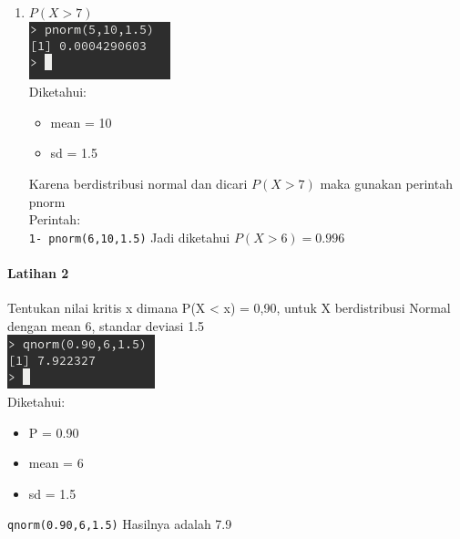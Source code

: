 \documentclass[a4paper,12pt]{article}
\begin{document}
\begin{enumerate}[label=\alph*.]
    \item $P(X > 7)$\\
        \includegraphics{lat1b}\\
        Diketahui:
        \begin{itemize}
            \item mean = 10
            \item sd = 1.5
        \end{itemize}
        Karena berdistribusi normal dan dicari $P(X > 7)$ maka gunakan perintah pnorm\\  
        Perintah:\\
        \texttt{1- pnorm(6,10,1.5)}
        Jadi diketahui $P(X > 6) = 0.996$

\end{enumerate}

\paragraph{Latihan 2\\}
Tentukan nilai kritis x dimana P(X < x) = 0,90, untuk X berdistribusi Normal dengan mean 6, standar deviasi 1.5\\
\includegraphics{lat2}\\
Diketahui:
\begin{itemize}
    \item P = 0.90
    \item mean = 6
    \item sd = 1.5
\end{itemize}
\texttt{qnorm(0.90,6,1.5)}
Hasilnya adalah 7.9
\end{document}
